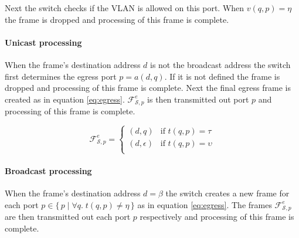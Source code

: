 \documentclass{article}
\begin{document}
Next the switch checks if the VLAN is allowed on this port. When
\( v(q, p) = \eta \)
the frame is dropped and processing of this frame is complete.

\paragraph{Unicast processing}
When the frame's destination address \(d\)
is not the broadcast address the switch first determines the egress port
\(p = a(d, q)\).
If it is not defined the frame is dropped and processing of this frame is
complete. Next the final egress frame is created as in equation
\eqref{eq:egress}. \( \mathcal{F}_{\mathcal{S}, p}^{e} \)
is then transmitted out port \(p\) and processing of this frame is complete.

\begin{equation}\label{eq:egress}
\mathcal{F}_{\mathcal{S}, p}^{e} =
\left\{
  \begin{array}{ll}
     (d,q) & \mbox{if } t(q, p) = \tau \\
     (d, \epsilon) & \mbox{if } t(q, p) = \upsilon\\
  \end{array}
\right.
\end{equation}


\paragraph{Broadcast processing}
When the frame's destination address \( d = \beta \)
the switch creates a new frame for each port
\( p \in \{\, p \mid \forall q.\; t(q, p) \neq \eta \,\} \)
as in equation \eqref{eq:egress}. The frames \( \mathcal{F}_{\mathcal{S}, p}^{e} \)
are then transmitted out each port \(p\)
respectively and processing of this frame is complete.
\end{document}
